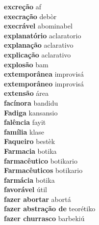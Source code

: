 \textbf{ excreção  } af \\
\textbf{ execração  } debòr \\
\textbf{ execrável  } abominabel \\
\textbf{ explanatório  } aclaratorio \\
\textbf{ explanação  } aclarativo \\
\textbf{ explicação  } aclarativo \\
\textbf{ explosão  } bam \\
\textbf{ extemporânea  } improvisá \\
\textbf{ extemporâneo  } improvisá \\
\textbf{ extensão  } área \\
\textbf{ facínora  } bandidu \\
\textbf{ Fadiga  } kansansio \\
\textbf{ falência  } fayit \\
\textbf{ família  } klase \\
\textbf{ Faqueiro  } bestèk \\
\textbf{ Farmacia  } botika \\
\textbf{ farmacêutico  } botikario \\
\textbf{ Farmacêuticos  } botikario \\
\textbf{ farmácia  } botika \\
\textbf{ favorável  } útil \\
\textbf{ fazer abortar  } abortá \\
\textbf{ fazer abstração de  } teorétiko \\
\textbf{ fazer churrasco  } barbekiú \\
